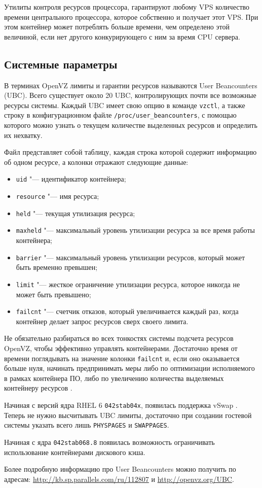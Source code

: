 Утилиты контроля ресурсов процессора, гарантируют любому VPS количество времени центрального процессора, которое собственно и получает этот VPS. 
При этом контейнер может потреблять больше времени, чем определено этой величиной, если нет другого конкурирующего с ним за время CPU сервера.

\subsection{Системные параметры}

В терминах OpenVZ лимиты и гарантии ресурсов называются User Beancounters (UBC). 
Всего существует около 20 UBC, контролирующих почти все возможные ресурсы системы. 
Каждый UBC имеет свою опцию в команде \texttt{vzctl}, а также строку в конфигурационном файле \texttt{/proc/user\_beancounters}, с помощью которого можно узнать о текущем количестве выделенных ресурсов и определить их нехватку. 

Файл представляет собой таблицу, каждая строка которой содержит информацию об одном ресурсе, а колонки отражают следующие данные:
\begin{itemize}
    \item \texttt{uid} "--- идентификатор контейнера;
    \item \texttt{resource} "--- имя ресурса;
    \item \texttt{held} "--- текущая утилизация ресурса;
    \item \texttt{maxheld} "--- максимальный уровень утилизации ресурса за все время работы контейнера;
    \item \texttt{barrier} "--- максимальный уровень утилизации ресурсов, который может быть временно превышен;
    \item \texttt{limit} "--- жесткое ограничение утилизации ресурса, которое никогда не может быть превышено;
    \item \texttt{failcnt} "--- счетчик отказов, который увеличивается каждый раз, когда контейнер делает запрос ресурсов сверх своего лимита.
\end{itemize}

Не обязательно разбираться во всех тонкостях системы подсчета ресурсов OpenVZ, чтобы эффективно управлять контейнерами. 
Достаточно время от времени поглядывать на значение колонки \texttt{failcnt} и, если оно оказывается больше нуля, начинать предпринимать меры либо по оптимизации исполняемого в рамках контейнера ПО, либо по увеличению количества выделяемых контейнеру ресурсов \cite{xakep}.

Начиная с версий ядра RHEL 6 \texttt{042stab04x}, появилась поддержка vSwap \cite{ubc}.
Теперь не нужно высчитывать UBC лимиты, достаточно при создании гостевой системы указать всего лишь \texttt{PHYSPAGES} и \texttt{SWAPPAGES}.

Начиная с ядра \texttt{042stab068.8} появилась возможность ограничивать использование контейнерами дискового кэша.

Более подробную информацию про User Beancounters можно получить по адресам: \url{http://kb.sp.parallels.com/ru/112807} и \url{http://openvz.org/UBC}.

\clearpage
